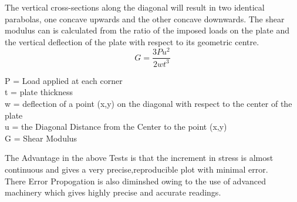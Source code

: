 \documentclass[12pt,a4paper]{article}	%
\begin{document}
\begin{itemize}
The vertical cross-sections along the diagonal will result in two identical parabolas, one concave upwards and the other concave downwards.
The shear modulus can is calculated from the ratio of the imposed loads on the plate and the vertical deflection of the plate with respect to its geometric centre.\\

\[ G = \frac{3Pu^2}{2wt^3}\]



P = Load applied at each corner\\
t = plate thickness\\
w = deflection of a point (x,y) on the diagonal with respect to the center of the plate\\
u = the Diagonal Distance from the Center to the point (x,y)\\
G = Shear Modulus \\

\end{itemize}
The Advantage in the above Tests is that the increment in stress is almost continuous and gives a very precise,reproducible plot with minimal error.\\

There Error Propogation is also diminshed owing to the use of advanced machinery which gives highly precise and accurate readings.\\

\thispagestyle{empty}	%
\end{document}
